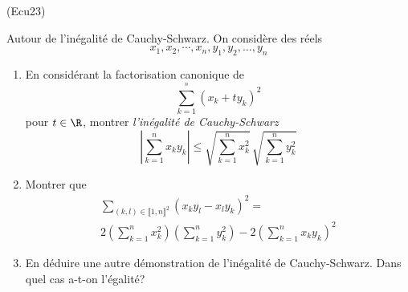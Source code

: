 \begin{tiny}(Ecu23)\end{tiny} \label{Ecu23} Autour de l'inégalité de Cauchy-Schwarz.\newline
On considère des réels
\begin{displaymath}
  x_1,x_2, \cdots, x_n, y_1, y_2, \dots ,y_n
\end{displaymath}
\begin{enumerate}
  \item En considérant la factorisation canonique de 
\begin{displaymath}
 \sum_{k=1}^{^n}(x_k + ty_k)^2
\end{displaymath}
pour $t\in \R$, montrer \emph{l'inégalité de Cauchy-Schwarz}
\begin{displaymath}
 \left|\sum_{k=1}^n x_k y_k \right| \leq \sqrt{\sum_{k=1}^n x_k^2}\, \sqrt{\sum_{k=1}^n y_k^2}
\end{displaymath}

  \item Montrer que 
\begin{multline*}
  \sum_{(k,l)\in\llbracket 1,n \rrbracket^2}(x_ky_l -x_ly_k)^2 = \\
  2 \left( \sum_{k=1}^n x_k^2\right) \left( \sum_{k=1}^n y_k^2\right) 
  - 2 \left( \sum_{k=1}^n x_k y_k\right)^2
\end{multline*}

  \item En déduire une autre démonstration de l'inégalité de Cauchy-Schwarz. Dans quel cas a-t-on l'égalité?

\end{enumerate}
